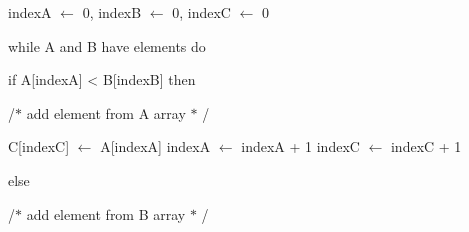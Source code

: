 \documentclass[12pt]{article}
\begin{document}
\begin{adjustwidth}{0.31in}{0.0in}
{\fontsize{11pt}{13.2pt}\selectfont indexA $ \leftarrow $  0, indexB $ \leftarrow $  0, indexC $ \leftarrow $  0\par}\par

\end{adjustwidth}

\begin{adjustwidth}{0.31in}{0.0in}
{\fontsize{11pt}{13.2pt}\selectfont while A and B have elements  do\par}\par

\end{adjustwidth}

\begin{adjustwidth}{0.54in}{0.0in}
{\fontsize{11pt}{13.2pt}\selectfont if A[indexA] < B[indexB] then\par}\par

\end{adjustwidth}

\begin{adjustwidth}{0.77in}{0.0in}
{\fontsize{11pt}{13.2pt}\selectfont /$\ast$  add element  from A array  $\ast$ /\par}\par

\end{adjustwidth}

\begin{adjustwidth}{0.77in}{4.83in}
{\fontsize{11pt}{13.2pt}\selectfont C[indexC] $ \leftarrow $  A[indexA] indexA $ \leftarrow $  indexA + 1 indexC $ \leftarrow $  indexC + 1\par}\par

\end{adjustwidth}

\begin{adjustwidth}{0.54in}{0.0in}
{\fontsize{11pt}{13.2pt}\selectfont else\par}\par

\end{adjustwidth}

\begin{adjustwidth}{0.77in}{0.0in}
{\fontsize{11pt}{13.2pt}\selectfont /$\ast$  add element  from B array  $\ast$ /\par}\par

\end{adjustwidth}
\end{document}
